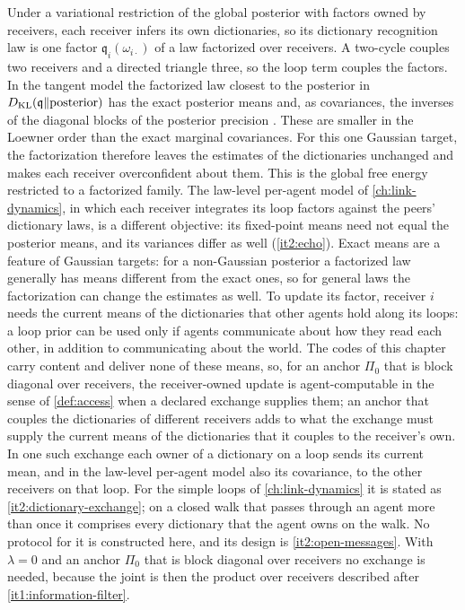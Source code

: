 Under a variational restriction of the global posterior with factors owned by receivers, each receiver infers its own dictionaries, so its dictionary recognition law is one factor $\mathfrak q_i(\omega_{i\cdot})$ of a law factorized over receivers. A two-cycle couples two receivers and a directed triangle three, so the loop term couples the factors. In the tangent model the factorized law closest to the posterior in $D_{\mathrm{KL}}(\mathfrak q\Vert\text{posterior})$ has the exact posterior means and, as covariances, the inverses of the diagonal blocks of the posterior precision \citep[Section~10.1.2]{Bishop2006}. These are smaller in the Loewner order than the exact marginal covariances. For this one Gaussian target, the factorization therefore leaves the estimates of the dictionaries unchanged and makes each receiver overconfident about them. This is the global free energy restricted to a factorized family. The law-level per-agent model of \cref{ch:link-dynamics}, in which each receiver integrates its loop factors against the peers' dictionary laws, is a different objective: its fixed-point means need not equal the posterior means, and its variances differ as well (\cref{it2:echo}). Exact means are a feature of Gaussian targets: for a non-Gaussian posterior a factorized law generally has means different from the exact ones, so for general laws the factorization can change the estimates as well. To update its factor, receiver $i$ needs the current means of the dictionaries that other agents hold along its loops: a loop prior can be used only if agents communicate about how they read each other, in addition to communicating about the world. The codes of this chapter carry content and deliver none of these means, so, for an anchor $\Pi_0$ that is block diagonal over receivers, the receiver-owned update is agent-computable in the sense of \cref{def:access} when a declared exchange supplies them; an anchor that couples the dictionaries of different receivers adds to what the exchange must supply the current means of the dictionaries that it couples to the receiver's own. In one such exchange each owner of a dictionary on a loop sends its current mean, and in the law-level per-agent model also its covariance, to the other receivers on that loop. For the simple loops of \cref{ch:link-dynamics} it is stated as \cref{it2:dictionary-exchange}; on a closed walk that passes through an agent more than once it comprises every dictionary that the agent owns on the walk. No protocol for it is constructed here, and its design is \cref{it2:open-messages}. With $\lambda=0$ and an anchor $\Pi_0$ that is block diagonal over receivers no exchange is needed, because the joint is then the product over receivers described after \cref{it1:information-filter}.

